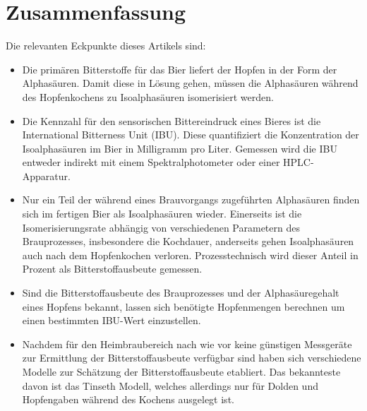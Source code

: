 \documentclass[a4paper,parskip=half]{scrartcl}
\begin{document}
\section*{Zusammenfassung}

Die relevanten Eckpunkte dieses Artikels sind:

\begin{itemize}
\item Die primären Bitterstoffe für das Bier liefert der Hopfen in der Form der Alphasäuren. Damit diese in Lösung gehen, müssen die Alphasäuren während des Hopfenkochens zu Isoalphasäuren isomerisiert werden.
   
\item Die Kennzahl für den sensorischen Bittereindruck eines Bieres ist die International Bitterness Unit (IBU). Diese quantifiziert die Konzentration der Isoalphasäuren im Bier in Milligramm pro Liter. Gemessen wird die IBU entweder indirekt mit einem Spektralphotometer oder einer HPLC-Apparatur.

\item Nur ein Teil der während eines Brauvorgangs zugeführten Alphasäuren finden sich im fertigen Bier als Isoalphasäuren wieder. Einerseits ist die Isomerisierungsrate abhängig von verschiedenen Parametern des Brauprozesses, insbesondere die Kochdauer, anderseits gehen Isoalphasäuren auch nach dem Hopfenkochen verloren. Prozesstechnisch wird dieser Anteil in Prozent als Bitterstoffausbeute gemessen.

\item Sind die Bitterstoffausbeute des Brauprozesses und der Alphasäuregehalt eines Hopfens bekannt, lassen sich benötigte Hopfenmengen berechnen um einen bestimmten IBU-Wert einzustellen.

\item Nachdem für den Heimbraubereich nach wie vor keine günstigen Messgeräte zur Ermittlung der Bitterstoffausbeute verfügbar sind haben sich verschiedene Modelle zur Schätzung der Bitterstoffausbeute etabliert. Das bekannteste davon ist das Tinseth Modell, welches allerdings nur für Dolden und Hopfengaben während des Kochens ausgelegt ist.

\end{itemize}

\printbibliography[title=Quellen]
\end{document}
